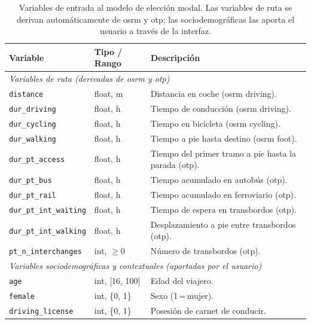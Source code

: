 \begin{table}[htbp]
  \caption[Variables de entrada al modelo de elección modal.]{Variables de entrada al modelo de elección modal. Las variables de ruta se derivan automáticamente de \gls{osrm} y \gls{otp}; las sociodemográficas las aporta el usuario a través de la interfaz.}
  \label{tab:lpmc_features}
  \centering
  \begin{tabular}{llp{5.5cm}}
    \toprule
    \textbf{Variable} & \textbf{Tipo / Rango} & \textbf{Descripción} \\
    \midrule
    \multicolumn{3}{l}{\textit{Variables de ruta (derivadas de \gls{osrm} y \gls{otp})}} \\
    \midrule
    \texttt{distance}              & float, m         & Distancia en coche (\gls{osrm} driving). \\
    \texttt{dur\_driving}          & float, h         & Tiempo de conducción (\gls{osrm} driving). \\
    \texttt{dur\_cycling}          & float, h         & Tiempo en bicicleta (\gls{osrm} cycling). \\
    \texttt{dur\_walking}          & float, h         & Tiempo a pie hasta destino (\gls{osrm} foot). \\
    \texttt{dur\_pt\_access}       & float, h         & Tiempo del primer tramo a pie hasta la parada (\gls{otp}). \\
    \texttt{dur\_pt\_bus}          & float, h         & Tiempo acumulado en autobús (\gls{otp}). \\
    \texttt{dur\_pt\_rail}         & float, h         & Tiempo acumulado en ferroviario (\gls{otp}). \\
    \texttt{dur\_pt\_int\_waiting} & float, h         & Tiempo de espera en transbordos (\gls{otp}). \\
    \texttt{dur\_pt\_int\_walking} & float, h         & Desplazamiento a pie entre transbordos (\gls{otp}). \\
    \texttt{pt\_n\_interchanges}   & int, $\geq 0$    & Número de transbordos (\gls{otp}). \\
    \midrule
    \multicolumn{3}{l}{\textit{Variables sociodemográficas y contextuales (aportadas por el usuario)}} \\
    \midrule
    \texttt{age}                   & int, [16, 100]   & Edad del viajero. \\
    \texttt{female}                & int, \{0, 1\}    & Sexo (1\,=\,mujer). \\
    \texttt{driving\_license}      & int, \{0, 1\}    & Posesión de carnet de conducir. \\

\end{tabular}
\end{table}
